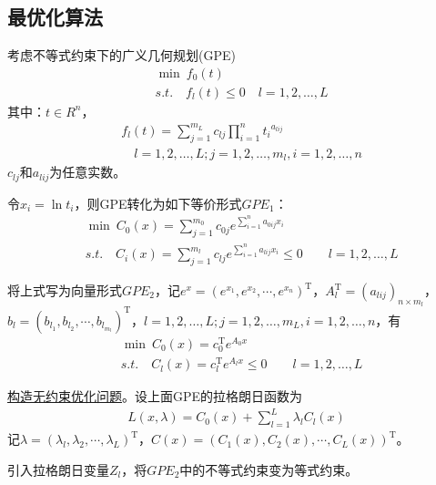     \subsection{最优化算法}
        \par
        考虑不等式约束下的广义几何规划(GPE)
        \begin{align*}
            &\mathop{\min}\  f_0(t)\\
            &s.t.\quad f_l(t)\leqslant 0\quad l=1,2,\ldots,L
            \end{align*}
        其中：$t\in R^n$，
        \begin{align*}
        &f_l(t)=\mathop{\sum}\limits_{j=1}^{m_L}c_{lj}\mathop{\prod}\limits_{i=1}^{n}{t_i}^{a_{lij}}\\
        &\quad l=1,2,\ldots,L;j=1,2,\ldots,m_l,i=1,2,\ldots,n
        \end{align*}
        $c_{lj}$和$a_{lij}$为任意实数。
        \par
        令$x_i={\ln}{} t_i$，则GPE转化为如下等价形式$GPE_1$：
        \begin{align*}
        &\mathop{\min}\ C_0(x)=\mathop{\sum}\limits_{j=1}^{m_0}c_{0j}e^{\mathop{\sum}\limits_{i=1}^{n}a_{0ij}x_i}\\
        &s.t.\quad C_i(x)=\mathop{\sum}\limits_{j=1}^{m_l}c_{lj}e^{\mathop{\sum}\limits_{i=1}^{n}a_{lij}x_i}\leqslant 0\qquad l=1,2,\ldots,L
        \end{align*}
        \par
        将上式写为向量形式$GPE_2$，记$e^x=(e^{x_1},e^{x_2},\cdots,e^{x_n})^\mathrm{T} $，$A_l^\mathrm{T} =(a_{lij})_{n\times m_l}$，$b_l=(b_{l_1},b_{l_2},\cdots,b_{l_{m_l}})^\mathrm{T} $，$l=1,2,\ldots,L;j=1,2,\ldots,m_L,i=1,2,\ldots,n$，有
        \begin{align*}
        &\mathop{\min}\ C_0(x)=c_0^\mathrm{T} e^{A_0x}\\
        &s.t.\quad C_l(x)=c_{l}^\mathrm{T} e^{A_lx}\leqslant 0\qquad l=1,2,\ldots,L
        \end{align*}
        \par
        \underline{构造无约束优化问题}。设上面GPE的拉格朗日函数为
        \begin{align*}
        L(x,\lambda)=C_0(x)+\mathop{\sum}\limits_{l=1}^{L}{\lambda}_lC_l(x)
        \end{align*}
        记$\lambda=({\lambda}_l,{\lambda}_2,\cdots,{\lambda}_L)^\mathrm{T} $，$C(x)=(C_1(x),C_2(x),\cdots,C_L(x))^\mathrm{T} $。
        \par
        引入拉格朗日变量$Z_l$，将$GPE_2$中的不等式约束变为等式约束。
